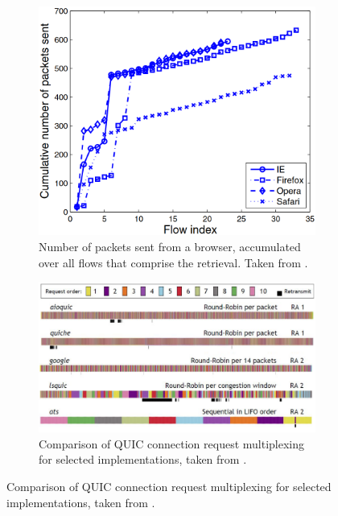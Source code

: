 \documentclass[runningheads]{llncs}
\begin{document}
\begin{figure}
\centering
\begin{subfigure}[t]{0.38\textwidth}
\includegraphics[width=\textwidth]{images/Browser.png}
\caption{Number of packets sent from a browser, accumulated over all flows that comprise the retrieval. Taken from \cite{yen2009browser}.}\label{Fig:Browser}
\end{subfigure}
\begin{subfigure}[t]{0.58\textwidth}
\includegraphics[width=\textwidth]{images/Protocol_differences.png}
\caption{Comparison of QUIC connection request multiplexing for selected implementations, taken from \cite{marx2020same}.}\label{Fig:QUIC}
\end{subfigure}
\end{figure}
\end{document}
